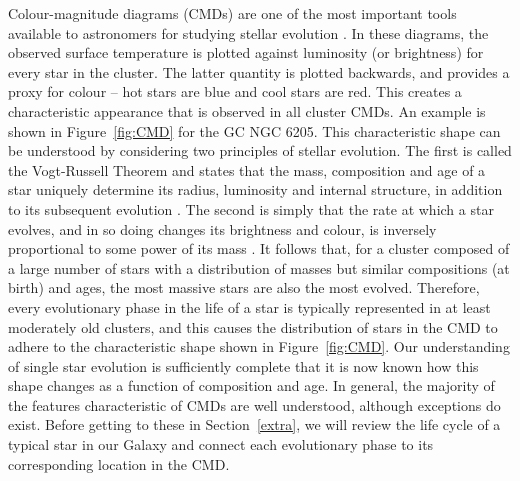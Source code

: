 Colour-magnitude diagrams (CMDs) are one of the most
important tools available to astronomers for studying stellar
evolution \citep{hertzsprung09}.  In these diagrams, the
observed surface temperature is 
plotted against luminosity (or brightness) for every star in the 
cluster.  The latter quantity is plotted backwards, and provides a
proxy for colour -- hot stars are blue and cool stars are red.
This creates a characteristic appearance that is observed in all
cluster CMDs.  An example is shown
in Figure~\ref{fig:CMD} for the GC NGC 
6205.  This characteristic shape can be understood by
considering two principles of stellar 
evolution.  The first is called the Vogt-Russell Theorem and states
that the mass, composition and age of a star uniquely determine its radius,
luminosity and internal structure, in addition to its subsequent
evolution \citep{vogt25, russell25}.  The second is simply that the
rate at which a star evolves, and in so doing changes its brightness
and colour, is inversely proportional to some power of its
mass \citep[e.g.][]{iben91}.  It follows that, for a cluster composed
of a large number of stars with a distribution of masses
but similar compositions (at birth) and ages, the most massive stars
are also the most evolved.  Therefore, every evolutionary phase in
the life of a star is typically represented in at least moderately old
clusters, and this causes the distribution of stars in the 
CMD to adhere to the characteristic shape shown in Figure~\ref{fig:CMD}.  
Our understanding of single star evolution is sufficiently
complete that it is now known how this shape changes as a
function of composition and age.  In general, the majority of the features
characteristic of CMDs are well understood, although exceptions
do exist.  Before getting to these in Section~\ref{extra}, we
will review the life cycle of a typical star in our Galaxy and connect
each evolutionary phase to its corresponding location in the CMD.

